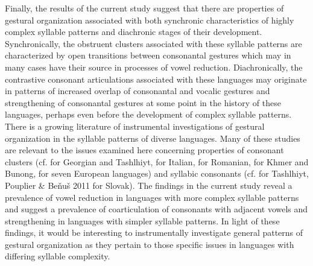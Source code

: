   Finally, the results of the current study suggest that there are properties of gestural organization associated with both synchronic characteristics of highly complex syllable patterns and diachronic stages of their development. Synchronically, the obstruent clusters associated with these syllable patterns are characterized by open transitions between consonantal gestures which may in many cases have their source in processes of vowel reduction. Diachronically, the contrastive consonant articulations associated with these languages may originate in patterns of increased overlap of consonantal and vocalic gestures and strengthening of consonantal gestures at some point in the history of these languages, perhaps even before the development of complex syllable patterns. There is a growing literature of instrumental investigations of gestural organization in the syllable patterns of diverse languages. Many of these studies are relevant to the issues examined here concerning properties of consonant clusters (cf. \citealt{GoldsteinEtAl2007} for Georgian and Tashlhiyt, \citealt{HermesEtAl2013} for Italian, \citealt{Marin2014} for Romanian, \citealt{Butler2015} for Khmer and Bunong, \citealt{MarinEtAl2017} for seven European languages) and syllabic consonants (cf. \citealt{HermesEtAl2011} for Tashlhiyt, Pouplier \& Beňuš 2011 for Slovak). The findings in the current study reveal a prevalence of vowel reduction in languages with more complex syllable patterns and suggest a prevalence of coarticulation of consonants with adjacent vowels and strengthening in languages with simpler syllable patterns. In light of these findings, it would be interesting to instrumentally investigate general patterns of gestural organization as they pertain to those specific issues in languages with differing syllable complexity.


